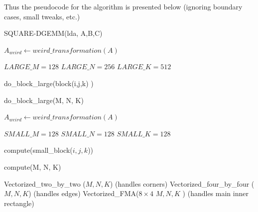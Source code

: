 \documentclass[12pt]{article}
\begin{document}
Thus the pseudocode for the algorithm is presented below (ignoring boundary cases, small tweaks, etc.) 

\begin{algorithm}
\caption{SQUARE-DGEMM(lda, A,B,C)}
\begin{algorithmic} 
\STATE $A_{weird} \leftarrow weird\_transformation(A)$

\STATE $LARGE\_M = 128$
\STATE $LARGE\_N = 256$
\STATE $LARGE\_K = 512$




\STATE do\_block\_large(block(i,j,k) )

\ENDFOR
\ENDFOR
\ENDFOR
\end{algorithmic}
\end{algorithm}

\begin{algorithm}
\caption{do\_block\_large(M, N, K)}
\begin{algorithmic} 
\STATE $A_{weird} \leftarrow weird\_transformation(A)$

\STATE $SMALL\_M = 128$
\STATE $SMALL\_N = 128$
\STATE $SMALL\_K = 128$


\STATE compute(small\_block($i,j,k$))

\ENDFOR
\ENDFOR
\ENDFOR
\end{algorithmic}
\end{algorithm}

\begin{algorithm}
\caption{compute(M, N, K)}
\begin{algorithmic} 


\STATE Vectorized\_two\_by\_two ($M,N,K$) (handles corners)
\STATE Vectorized\_four\_by\_four ($M,N,K$) (handles edges)
\STATE Vectorized\_FMA($8 \times 4$ $M,N,K$ ) (handles main inner rectangle)

\end{algorithmic}
\end{algorithm}

\newpage 
\end{document}
